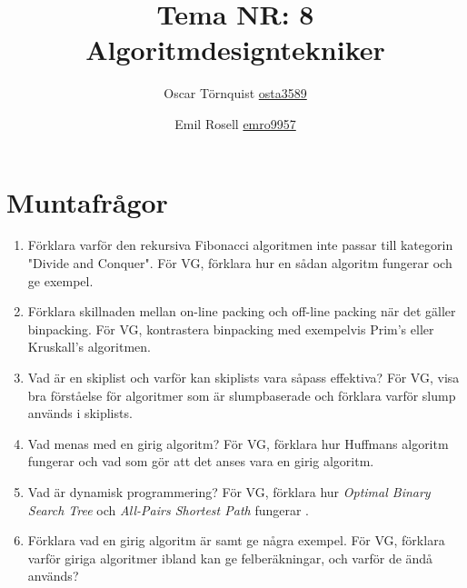 \documentclass[a5paper,10pt,oneside]{article}
\title{Tema NR: 8 Algoritmdesigntekniker}
\author{Oscar Törnquist \url{osta3589} \and Emil Rosell \url{emro9957}}
\begin{document}
\maketitle

\section*{Muntafrågor}
\begin{enumerate}
\item Förklara varför den rekursiva Fibonacci algoritmen inte passar till kategorin "Divide and Conquer". För VG, förklara hur en sådan algoritm fungerar och ge exempel.

\item Förklara skillnaden mellan on-line packing och off-line packing när det gäller binpacking. För VG, kontrastera binpacking med exempelvis Prim's eller Kruskall's algoritmen.

\item Vad är en skiplist och varför kan skiplists vara såpass effektiva? För VG, visa bra förståelse för algoritmer som är slumpbaserade och förklara varför slump används i skiplists.
\item
Vad menas med en girig algoritm? För VG, förklara hur Huffmans algoritm fungerar och vad som gör att det anses vara en girig algoritm.
\item
Vad är dynamisk programmering? För VG, förklara hur \textit{Optimal Binary Search Tree} och \textit{All-Pairs Shortest Path} fungerar . 
\item
Förklara vad en girig algoritm är samt ge några exempel. För VG, förklara varför giriga algoritmer ibland kan ge felberäkningar, och varför de ändå används?

\end{enumerate}
\end{document}
